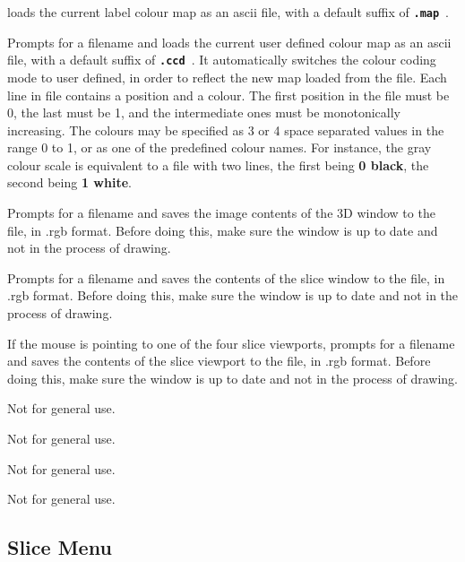 \documentclass{article}
\newcommand{\ident}[1]{{\bf\tt #1}\ }
\newcommand{\menutwo}[2]{{\scriptsize \fbox{\bf #1}/\fbox{\bf #2}}}
\begin{document}
\begin{description}
        loads the current label colour map as an ascii file, with a default
        suffix of \ident{.map}.
\item[\menutwo{File}{Load UserDef ColCode}]  Prompts for a filename and
        loads the current user defined colour map as an ascii file,
        with a default suffix of \ident{.ccd}.  It automatically switches
        the colour coding mode to user defined, in order to reflect the
        new map loaded from the file.  Each line in file contains a position
        and a colour.  The first position in the file must be 0, the last
        must be 1, and the intermediate ones must be monotonically increasing.
        The colours may be specified as 3 or 4 space separated values in the
        range 0 to 1, or as one of the predefined colour names.  For instance,
        the gray colour scale is equivalent to a file with two lines, the
        first being {\bf 0  black}, the second being {\bf 1 white}.

        
\item[\menutwo{File}{Save 3D Window}]  Prompts for a filename and saves the
      image contents of the 3D window to the file, in .rgb format.  Before
      doing this, make sure the window is up to date and not in the process of
      drawing.
\item[\menutwo{File}{Save Slice Window}]  Prompts for a filename and saves the
      contents of the slice window to the file, in .rgb format.  Before doing
      this, make sure the window is up to date and not in the process of
      drawing.
\item[\menutwo{File}{Save Slice Image}]  If the mouse is pointing to one
      of the four slice viewports, prompts for a filename and saves the
      contents of the slice viewport to the file, in .rgb format.  Before doing
      this, make sure the window is up to date and not in the process of
      drawing.

\item[\menutwo{File}{Load Poly Visib.}]  Not for general use.
\item[\menutwo{File}{Save Poly Visib.}]  Not for general use.
\item[\menutwo{File}{Save Bintree}]  Not for general use.
\item[\menutwo{File}{Load Bintree}]  Not for general use.
\end{description}

\subsection{Slice Menu}
\end{document}
